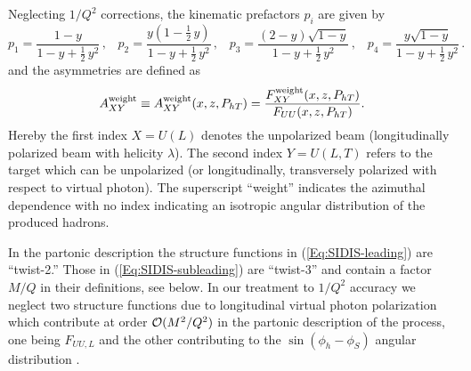 \documentclass[a4paper,11pt]{article}
\newcommand{\be}{\begin{equation}}
\newcommand{\ee}{\end{equation}}
\newcommand{\ba}{\begin{eqnarray}}
\newcommand{\ea}{\end{eqnarray}}
\newcommand{\slim}{\mskip 1.5mu}       %
\def\Phperp{P_{hT}}
\begin{document}
Neglecting $1/Q^2$ corrections, the kinematic prefactors $p_i$ are given by 
\be\label{Eq:y-prefactors}
	p_1 = \frac{1-y}{1-y+\frac12\,y^2} 		\, , \;\;\;
	p_2 = \frac{y(1-\frac12\,y)}{1-y+\frac12\,y^2}	\, , \;\;\;
	p_3 = \frac{(2-y)\sqrt{1-y}}{1-y+\frac12\,y^2} 	\, , \;\;\;
	p_4 = \frac{y\sqrt{1-y}}{1-y+\frac12\,y^2}     	\, .
\ee
and the asymmetries are defined as 
\be
	A_{XY}^{\rm weight}\equiv A_{XY}^{\rm weight}(x,z,\Phperp)=
	\frac{F_{XY}^{\rm weight}(x,z,\Phperp)}{F_{UU}(x,z,\Phperp)}.
\ee
Hereby the first index $X=U(L)$ denotes the unpolarized beam
(longitudinally polarized beam with helicity $\lambda$).
The second index $Y=U(L,T)$ refers to the target which can be unpolarized
(or longitudinally, transversely polarized with respect to virtual photon).
The superscript ``weight'' indicates the azimuthal dependence with no index 
indicating an isotropic angular distribution of the produced hadrons.

In the partonic description the structure functions in 
(\ref{Eq:SIDIS-leading})    are ``twist-2.'' Those in
(\ref{Eq:SIDIS-subleading}) are ``twist-3'' and contain a
factor $M/Q$ in their definitions, see below. In our treatment to $1/Q^2$ 
accuracy we neglect two structure functions due to longitudinal virtual 
photon polarization which contribute at order ${\cal O}(M^2/Q^2)$ in the 
partonic description of the process, one being $F_{UU,L}$ and the other 
contributing to the $\sin(\phi_h-\phi_S)$ angular distribution 
\cite{Bacchetta:2006tn}.
\end{document}
